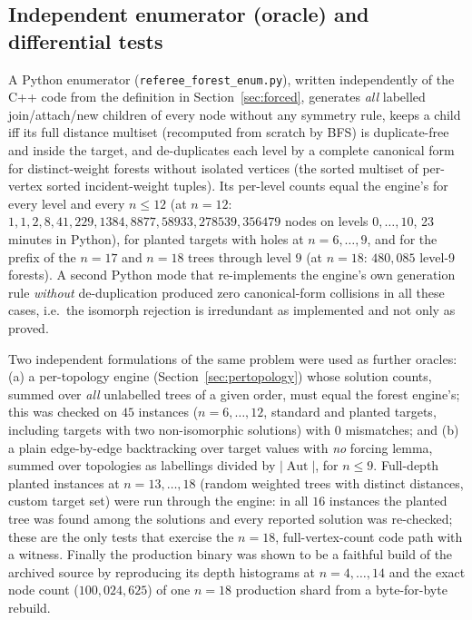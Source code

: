 \documentclass[11pt,a4paper]{article}
\theoremstyle{plain}
\theoremstyle{remark}
\newcommand{\Aut}{\operatorname{Aut}}
\newcommand{\file}[1]{\texttt{#1}}
\begin{document}
\subsection{Independent enumerator (oracle) and differential tests}\label{sec:oracle}

A Python enumerator (\file{referee\_forest\_enum.py}), written independently of
the C++ code from the definition in Section~\ref{sec:forced}, generates
\emph{all} labelled join/attach/new children of every node without any symmetry
rule, keeps a child iff its full distance multiset (recomputed from scratch by
BFS) is duplicate-free and inside the target, and de-duplicates each level by a
complete canonical form for distinct-weight forests without isolated vertices
(the sorted multiset of per-vertex sorted incident-weight tuples).  Its
per-level counts equal the engine's for every level and every $n\le 12$ (at
$n=12$: $1,1,2,8,41,229,1384,8877,58933,278539,356479$ nodes on levels
$0,\dots,10$, 23 minutes in Python), for planted targets with holes at
$n=6,\dots,9$, and for the prefix of the $n=17$ and $n=18$ trees through level
$9$ (at $n=18$: $480{,}085$ level-9 forests).  A second Python mode that
re-implements the engine's own generation rule \emph{without} de-duplication
produced zero canonical-form collisions in all these cases, i.e.\ the isomorph
rejection is irredundant as implemented and not only as proved.

Two independent formulations of the same problem were used as further oracles:
(a) a per-topology engine (Section~\ref{sec:pertopology}) whose solution counts,
summed over \emph{all} unlabelled trees of a given order, must equal the forest
engine's; this was checked on $45$ instances ($n=6,\dots,12$, standard and
planted targets, including targets with two non-isomorphic solutions) with $0$
mismatches; and (b) a plain edge-by-edge backtracking over target values with
\emph{no} forcing lemma, summed over topologies as labellings divided by
$|\Aut|$, for $n\le 9$.  Full-depth planted instances at $n=13,\dots,18$
(random weighted trees with distinct distances, custom target set) were run
through the engine: in all $16$ instances the planted tree was found among the
solutions and every reported solution was re-checked; these are the only tests
that exercise the $n=18$, full-vertex-count code path with a witness.  Finally
the production binary was shown to be a faithful build of the archived source by
reproducing its depth histograms at $n=4,\dots,14$ and the exact node count
($100{,}024{,}625$) of one $n=18$ production shard from a byte-for-byte rebuild.
\end{document}
